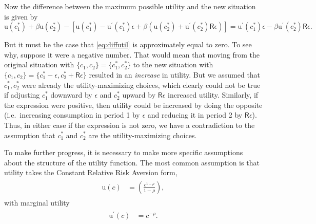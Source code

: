 \documentclass{scrartcl}
\begin{document}
  Now the difference between the maximum possible utility and the new situation is given by
  \begin{equation} \mathrm{u}(\boldsymbol{\mathit{c}}_{1}^{*})+\beta \mathrm{u}(\boldsymbol{\mathit{c}}_{2}^{*}) - \left[\mathrm{u}(\boldsymbol{\mathit{c}}_{1}^{*})-\mathrm{u}^{\prime}(\boldsymbol{\mathit{c}}_{1}^{*})\epsilon + \beta \left(\mathrm{u}(\boldsymbol{\mathit{c}}_{2}^{*})+\mathrm{u}^{\prime}(\boldsymbol{\mathit{c}}_{2}^{*})\mathsf{R}\epsilon \right) \right] = \mathrm{u}^{\prime}(\boldsymbol{\mathit{c}}_{1}^{*})\epsilon - \beta \mathrm{u}^{\prime}(\boldsymbol{\mathit{c}}_{2}^{*})\mathsf{R}\epsilon \label{eq:diffutil}.
  \end{equation}

  But it must be the case that \eqref{eq:diffutil} is approximately equal to zero.  To see why, suppose it were a negative number.  That would mean that moving from the original situation with $\{\boldsymbol{\mathit{c}}_{1},\boldsymbol{\mathit{c}}_{2}\} = \{\boldsymbol{\mathit{c}}_{1}^{*},\boldsymbol{\mathit{c}}_{2}^{*}\}$ to the new situation with $\{\boldsymbol{\mathit{c}}_{1},\boldsymbol{\mathit{c}}_{2}\} = \{\boldsymbol{\mathit{c}}_{1}^{*}-\epsilon,\boldsymbol{\mathit{c}}_{2}^{*}+\mathsf{R}\epsilon\}$ resulted in an \textit{increase} in utility.  But we assumed that $\boldsymbol{\mathit{c}}_{1}^{*},\boldsymbol{\mathit{c}}_{2}^{*}$ were already the utility-maximizing choices, which clearly could not be true if adjusting $\boldsymbol{\mathit{c}}_{1}^{*}$ downward by $\epsilon$ and $\boldsymbol{\mathit{c}}^{*}_{2}$ upward by $\mathsf{R} \epsilon$ increased utility.  Similarly, if the expression were positive, then utility could be increased by doing the opposite (i.e.\ increasing consumption in period 1 by $\epsilon$ and reducing it in period 2 by $\mathsf{R}\epsilon$).  Thus, in either case if the expression is not zero, we have a contradiction to the assumption that $\boldsymbol{\mathit{c}}_{1}^{*}$ and $\boldsymbol{\mathit{c}}_{2}^{*}$ are the utility-maximizing choices.

  To make further progress, it is necessary to make more specific assumptions about the structure of the utility function.  The most common assumption is that utility takes the Constant Relative Risk Aversion form,
  \begin{equation}\begin{gathered}\begin{aligned} \mathrm{u}(\boldsymbol{\mathit{c}}) & = \left(\frac{\boldsymbol{\mathit{c}}^{1-\rho}}{1-\rho}\right) \label{eq:crrautil},
      \end{aligned}\end{gathered}\end{equation} with marginal utility
  \begin{equation}\begin{gathered}\begin{aligned} \mathrm{u}^{\prime}(\boldsymbol{\mathit{c}}) & = \boldsymbol{\mathit{c}}^{-\rho} \label{eq:crramargutil}.
      \end{aligned}\end{gathered}\end{equation}
\end{document}
